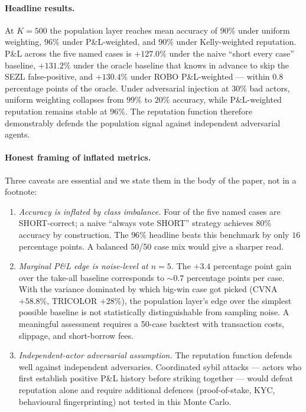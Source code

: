 \documentclass[11pt,a4paper]{article}
\begin{document}
\paragraph{Headline results.} At $K = 500$ the population layer reaches mean accuracy of $90\%$ under uniform weighting, $96\%$ under P\&L-weighted, and $90\%$ under Kelly-weighted reputation. P\&L across the five named cases is $+127.0\%$ under the naive ``short every case'' baseline, $+131.2\%$ under the oracle baseline that knows in advance to skip the SEZL false-positive, and $+130.4\%$ under ROBO P\&L-weighted --- within $0.8$ percentage points of the oracle. Under adversarial injection at $30\%$ bad actors, uniform weighting collapses from $99\%$ to $20\%$ accuracy, while P\&L-weighted reputation remains stable at $96\%$. The reputation function therefore demonstrably defends the population signal against independent adversarial agents.

\paragraph{Honest framing of inflated metrics.} Three caveats are essential and we state them in the body of the paper, not in a footnote:
\begin{enumerate}
\item \emph{Accuracy is inflated by class imbalance.} Four of the five named cases are SHORT-correct; a naive ``always vote SHORT'' strategy achieves $80\%$ accuracy by construction. The $96\%$ headline beats this benchmark by only $16$ percentage points. A balanced 50/50 case mix would give a sharper read.
\item \emph{Marginal P\&L edge is noise-level at $n=5$.} The $+3.4$ percentage point gain over the take-all baseline corresponds to $\sim 0.7$ percentage points per case. With the variance dominated by which big-win case got picked (CVNA $+58.8\%$, TRICOLOR $+28\%$), the population layer's edge over the simplest possible baseline is not statistically distinguishable from sampling noise. A meaningful assessment requires a 50-case backtest with transaction costs, slippage, and short-borrow fees.
\item \emph{Independent-actor adversarial assumption.} The reputation function defends well against independent adversaries. Coordinated sybil attacks --- actors who first establish positive P\&L history before striking together --- would defeat reputation alone and require additional defences (proof-of-stake, KYC, behavioural fingerprinting) not tested in this Monte Carlo.
\end{enumerate}
\end{document}
